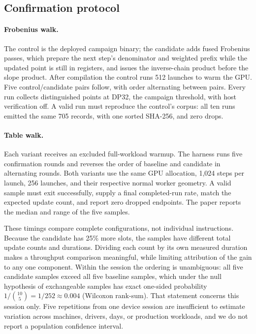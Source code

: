 \documentclass[11pt,a4paper]{article}
\begin{document}
\subsection{Confirmation protocol}
\paragraph{Frobenius walk.} The control is the deployed campaign binary; the candidate adds fused Frobenius passes, which prepare the next step's denominator and weighted prefix while the updated point is still in registers, and issues the inverse-chain product before the slope product. After compilation the control runs 512 launches to warm the GPU. Five control/candidate pairs follow, with order alternating between pairs. Every run collects distinguished points at DP32, the campaign threshold, with host verification off. A valid run must reproduce the control's corpus: all ten runs emitted the same 705 records, with one sorted SHA-256, and zero drops.

\paragraph{Table walk.} Each variant receives an excluded full-workload warmup. The harness runs five confirmation rounds and reverses the order of baseline and candidate in alternating rounds. Both variants use the same GPU allocation, 1,024 steps per launch, 256 launches, and their respective normal worker geometry. A valid sample must exit successfully, supply a final completed-run rate, match the expected update count, and report zero dropped endpoints. The paper reports the median and range of the five samples.

These timings compare complete configurations, not individual instructions. Because the candidate has 25\% more slots, the samples have different total update counts and durations. Dividing each count by its own measured duration makes a throughput comparison meaningful, while limiting attribution of the gain to any one component. Within the session the ordering is unambiguous: all five candidate samples exceed all five baseline samples, which under the null hypothesis of exchangeable samples has exact one-sided probability $1/\binom{10}{5}=1/252\approx0.004$ (Wilcoxon rank-sum). That statement concerns this session only. Five repetitions from one device session are insufficient to estimate variation across machines, drivers, days, or production workloads, and we do not report a population confidence interval.
\end{document}
